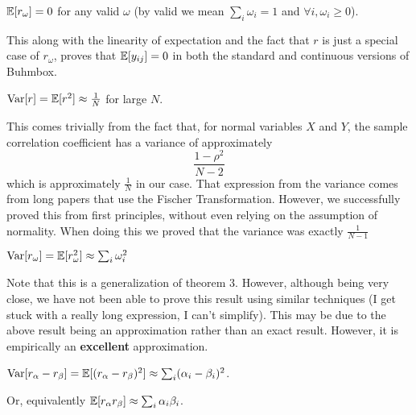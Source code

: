 \documentclass[11pt]{hw-template}
\begin{document}
  \begin{theorem}
    $\operatorname{\mathbb{E}}[r_\omega] = 0$ for any valid $\omega$ (by valid we mean $\sum_i \omega_i = 1$ and $\forall i, \omega_i \geq 0$).
  \end{theorem}

  \begin{remark}
    This along with the linearity of expectation and the fact that $r$ is just a special case of $r_\omega$, proves that $\operatorname{\mathbb{E}}[y_{ij}] = 0$ in both the standard and continuous versions of Buhmbox.
  \end{remark}


  \begin{theorem}
    $\operatorname{Var}[r] = \operatorname{\mathbb{E}}[r^2] \approx \frac{1}{N}$ for large $N$.
  \end{theorem}

  \begin{remark}
    This comes trivially from the fact that, for normal variables $X$ and $Y$, the sample correlation coefficient has a variance of approximately $$\frac{1 - \rho^2}{N - 2}$$ which is approximately $\frac{1}{N}$
    in our case. That expression from the variance comes from long papers that use the Fischer Transformation. However, we successfully proved this from first principles, without even relying on the assumption
    of normality. When doing this we proved that the variance was exactly $\frac{1}{N-1}$ 
  \end{remark}

  \begin{conjecture}
    $\operatorname{Var}[r_\omega] = \operatorname{\mathbb{E}}[r_\omega^2] \approx \sum_i \omega_i^2$
  \end{conjecture}

  \begin{remark}
    Note that this is a generalization of theorem 3. However, although being very close, we have not been able to prove this result using similar techniques (I get stuck with a really long expression,
    I can't simplify). This may be due to the above result being an approximation rather than an exact result. However, it is empirically an \textbf{excellent} approximation.
  \end{remark}

  \begin{conjecture}
    $\operatorname{Var}[r_\alpha - r_\beta] = \operatorname{\mathbb{E}}[(r_\alpha - r_\beta)^2] \approx \sum_i (\alpha_i - \beta_i)^2$.
    
    Or, equivalently $\operatorname{\mathbb{E}}[r_\alpha r_\beta] \approx \sum_i \alpha_i \beta_i$.
  \end{conjecture}
\end{document}
